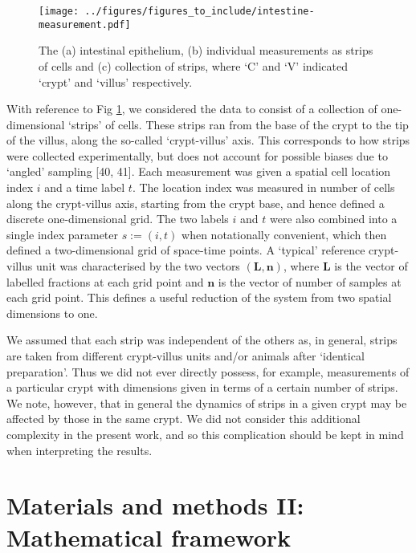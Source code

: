 \documentclass[10pt,letterpaper]{article}
\begin{document}
\begin{figure}
\centering
\texttt{[image: ../figures/figures\_to\_include/intestine-measurement.pdf]}
\caption{The (a) intestinal epithelium, (b) individual measurements as
strips of cells and (c) collection of strips, where `C' and `V'
indicated `crypt' and `villus'
respectively.\label{fig:intestine-measurement}}
\end{figure}

With reference to Fig \ref{fig:intestine-measurement}, we considered the
data to consist of a collection of one-dimensional `strips' of cells.
These strips ran from the base of the crypt to the tip of the villus,
along the so-called `crypt-villus' axis. This corresponds to how strips
were collected experimentally, but does not account for possible biases
due to `angled' sampling {[}40, 41{]}. Each measurement was given a
spatial cell location index \(i\) and a time label \(t\). The location
index was measured in number of cells along the crypt-villus axis,
starting from the crypt base, and hence defined a discrete
one-dimensional grid. The two labels \(i\) and \(t\) were also combined
into a single index parameter \(s := (i,t)\) when notationally
convenient, which then defined a two-dimensional grid of space-time
points. A `typical' reference crypt-villus unit was characterised by the
two vectors \((\mathbf{L},\mathbf{n})\), where \(\mathbf{L}\) is the
vector of labelled fractions at each grid point and \(\mathbf{n}\) is
the vector of number of samples at each grid point. This defines a
useful reduction of the system from two spatial dimensions to one.

We assumed that each strip was independent of the others as, in general,
strips are taken from different crypt-villus units and/or animals after
`identical preparation'. Thus we did not ever directly possess, for
example, measurements of a particular crypt with dimensions given in
terms of a certain number of strips. We note, however, that in general
the dynamics of strips in a given crypt may be affected by those in the
same crypt. We did not consider this additional complexity in the
present work, and so this complication should be kept in mind when
interpreting the results.

\section{Materials and methods II: Mathematical
framework}\label{materials-and-methods-ii-mathematical-framework}
\end{document}
